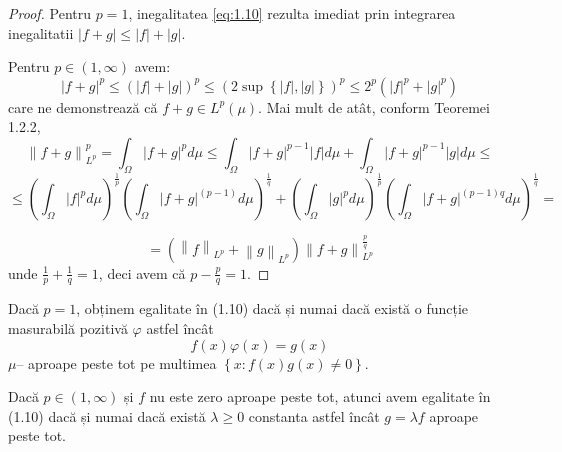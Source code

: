 \documentclass[a4paper,12pt,oneside]{report}
\begin{document}
\begin{proof}
Pentru \(p  = 1\), inegalitatea \ref{eq:1.10} rezulta imediat prin integrarea inegalitatii \(\left | f + g \right |\leq \left | f \right | + \left | g \right |\).

Pentru \(p \in \left ( 1 , \infty  \right )\) avem:
\begin{displaymath}
  \left | f + g  \right |^{p}\leq \left ( \left | f \right | +\left | g \right |\right )^{p}\leq \left ( 2 \sup\left \{ \left | f \right |,\left | g \right | \right \} \right )^{p}\leq 2^{p}\left ( \left | f \right |^{p}  + \left | g \right |^{p}\right )
\end{displaymath}
care ne demonstrează că \(f + g \in L^{p}\left ( \mu  \right )\). Mai mult de atât, conform Teoremei 1.2.2,
\begin{displaymath}
  \left \| f + g  \right \|_{L^{p}}^{p} = \int_{\Omega }\left | f + g \right |^{p}d\mu \leq \int_{\Omega }\left | f + g \right |^{p - 1}\left | f \right |d\mu + \int_{\Omega }\left | f + g  \right |^{p - 1}\left | g \right |d\mu \leq
\end{displaymath}
\begin{displaymath}
  \leq\left ( \int_{\Omega }\left | f \right |^{p}d\mu  \right )^{\frac{1}{p}}\left ( \int_{\Omega }\left | f + g  \right | ^{\left ( p - 1 \right )}d\mu \right )^{\frac{1}{q}}+ \left ( \int_{\Omega }\left | g \right |^{p}d\mu  \right )^{\frac{1}{p}}\left ( \int_{\Omega} \left | f + g \right |^{\left ( p - 1 \right )q}d\mu \right )^{\frac{1}{q}}=
\end{displaymath}

\begin{displaymath}
  =\left ( \left \| f \right \|_{L^{p}} + \left \| g \right \|_{L^{p}} \right )\left \| f + g  \right \|_{L^{p}}^{\frac{p}{q}}
\end{displaymath}
unde \(\frac{1}{p} + \frac{1}{q} = 1\), deci avem că \(p - \frac{p}{q} = 1\). 	
\end{proof}



Dacă \(p = 1\), obținem egalitate în (1.10) dacă și numai dacă există o funcție masurabilă pozitivă \(\varphi\) astfel încât
\begin{displaymath}
  f\left ( x \right )\varphi \left ( x \right ) = g\left ( x \right )
\end{displaymath}
\(\mu –\) aproape peste tot pe multimea \(\left \{ x : f\left ( x \right )g\left ( x \right )\neq 0 \right \}\).

	Dacă \(p \in \left ( 1 , \infty  \right )\) și \(f\) nu este zero aproape peste tot, atunci avem egalitate în (1.10) dacă și numai dacă există  \(\lambda \geq 0\) constanta astfel încât \(g = \lambda f\) aproape peste tot.
\end{document}
